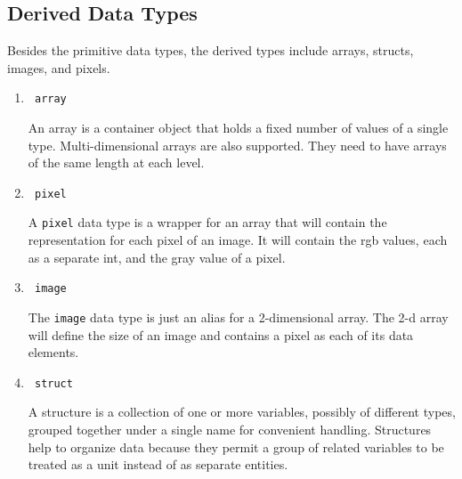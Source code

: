 \subsection{Derived Data Types}\label{ssec: Derived Data Types} 
Besides the primitive data types, the derived types include arrays, structs, images, and pixels. 
\begin{enumerate}
\item \begin{verbatim} array \end{verbatim}
An array is a container object that holds a fixed number of values of a single type. Multi-dimensional arrays are also supported. They need to have arrays of the same length at each level. 
\item \begin{verbatim} pixel \end{verbatim}
A \lstinline|pixel| data type is a wrapper for an array that will contain the representation for each pixel of an image. It will contain the rgb values, each as a separate int, and the gray value of a pixel.
\item \begin{verbatim} image \end{verbatim}
The \lstinline|image| data type is just an alias for a 2-dimensional array. The 2-d array will define the size of an image and contains a pixel as each of its data elements. 
\item \begin{verbatim} struct \end{verbatim}
A structure is a collection of one or more variables, possibly of different types, grouped together under a single name for convenient handling. Structures help to organize data because they permit a group of related variables to be treated as a unit instead of as separate entities. 
\end{enumerate}

